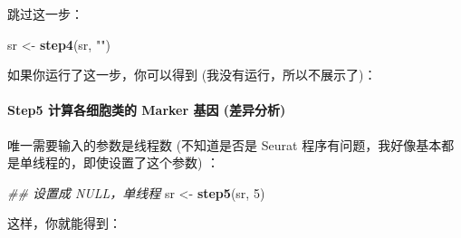 \documentclass[
]{article}
\newenvironment{Shaded}{\begin{snugshade}}{\end{snugshade}}
\newcommand{\CommentTok}[1]{\textcolor[rgb]{0.56,0.35,0.01}{\textit{#1}}}
\newcommand{\DecValTok}[1]{\textcolor[rgb]{0.00,0.00,0.81}{#1}}
\newcommand{\KeywordTok}[1]{\textcolor[rgb]{0.13,0.29,0.53}{\textbf{#1}}}
\newcommand{\NormalTok}[1]{#1}
\newcommand{\OperatorTok}[1]{\textcolor[rgb]{0.81,0.36,0.00}{\textbf{#1}}}
\newcommand{\StringTok}[1]{\textcolor[rgb]{0.31,0.60,0.02}{#1}}
\begin{document}
跳过这一步：

\begin{Shaded}
\begin{Highlighting}[]
\NormalTok{sr \textless{}{-}}\StringTok{ }\KeywordTok{step4}\NormalTok{(sr, }\StringTok{""}\NormalTok{)}
\end{Highlighting}
\end{Shaded}

如果你运行了这一步，你可以得到 (我没有运行，所以不展示了)：

\begin{Shaded}
\end{Shaded}

\hypertarget{step5-ux8ba1ux7b97ux5404ux7ec6ux80deux7c7bux7684-marker-ux57faux56e0-ux5deeux5f02ux5206ux6790}{%
\paragraph{Step5 计算各细胞类的 Marker 基因 (差异分析)}\label{step5-ux8ba1ux7b97ux5404ux7ec6ux80deux7c7bux7684-marker-ux57faux56e0-ux5deeux5f02ux5206ux6790}}

唯一需要输入的参数是线程数 (不知道是否是 Seurat 程序有问题，我好像基本都是单线程的，即使设置了这个参数) ：

\begin{Shaded}
\begin{Highlighting}[]
\CommentTok{\#\# 设置成 NULL，单线程}
\NormalTok{sr \textless{}{-}}\StringTok{ }\KeywordTok{step5}\NormalTok{(sr, }\DecValTok{5}\NormalTok{)}
\end{Highlighting}
\end{Shaded}

这样，你就能得到：

\begin{Shaded}
\end{Shaded}
\end{document}

